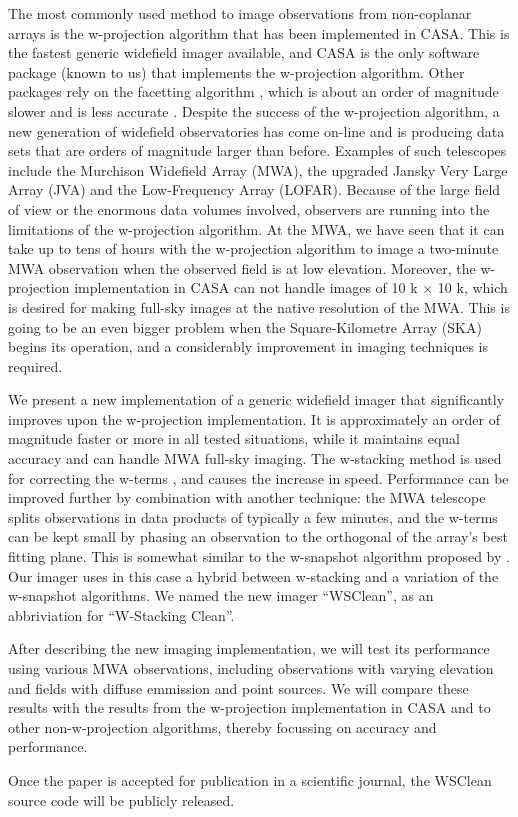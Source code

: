 \documentclass[a4paper,10pt]{article}
\begin{document}
The most commonly used method to image observations from non-coplanar arrays is the w-projection algorithm \citep{wprojection-cornwell} that has been implemented in CASA. This is the fastest generic widefield imager available, and CASA is the only software package (known to us) that implements the w-projection algorithm. Other packages rely on the facetting algorithm \citep{facetting-cornwell}, which is about an order of magnitude slower and is less accurate \citep{wprojection-cornwell}. Despite the success of the w-projection algorithm, a new generation of widefield observatories has come on-line and is producing data sets that are orders of magnitude larger than before. Examples of such telescopes include the Murchison Widefield Array (MWA), the upgraded Jansky Very Large Array (JVA) and the Low-Frequency Array (LOFAR). Because of the large field of view or the enormous data volumes involved, observers are running into the limitations of the w-projection algorithm. At the MWA, we have seen that it can take up to tens of hours with the w-projection algorithm to image a two-minute MWA observation when the observed field is at low elevation. Moreover, the w-projection implementation in CASA can not handle images of 10 k $\times$ 10 k, which is desired for making full-sky images at the native resolution of the MWA. This is going to be an even bigger problem when the Square-Kilometre Array (SKA) begins its operation, and a considerably improvement in imaging techniques is required.

We present a new implementation of a generic widefield imager that significantly improves upon the w-projection implementation. It is approximately an order of magnitude faster or more in all tested situations, while it maintains equal accuracy and can handle MWA full-sky imaging. The w-stacking method is used for correcting the w-terms \citep{widefield-imaging-ska-cornwell}, and causes the increase in speed. Performance can be improved further by combination with another technique: the MWA telescope splits observations in data products of typically a few minutes, and the w-terms can be kept small by phasing an observation to the orthogonal of the array's best fitting plane. This is somewhat similar to the w-snapshot algorithm proposed by \citet{widefield-imaging-ska-cornwell}. Our imager uses in this case a hybrid between w-stacking and a variation of the w-snapshot algorithms. We named the new imager ``WSClean'', as an abbriviation for ``W-Stacking Clean''.

After describing the new imaging implementation, we will test its performance using various MWA observations, including observations with varying elevation and fields with diffuse emmission and point sources. We will compare these results with the results from the w-projection implementation in CASA and to other non-w-projection algorithms, thereby focussing on accuracy and performance.

Once the paper is accepted for publication in a scientific journal, the WSClean source code will be publicly released.

\label{lastpage}



\end{document}
